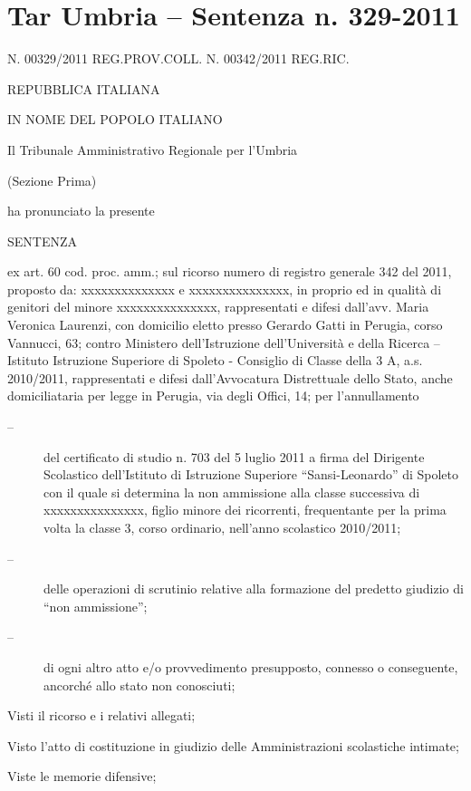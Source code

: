 \chapter{Tar Umbria – Sentenza n. 329-2011}
\label{cha:TarUmbriaSentenza329_2011}

N. 00329/2011 REG.PROV.COLL.
N. 00342/2011 REG.RIC.
\begin{center}
REPUBBLICA ITALIANA

IN NOME DEL POPOLO ITALIANO

Il Tribunale Amministrativo Regionale per l’Umbria

(Sezione Prima)

ha pronunciato la presente

SENTENZA
\end{center}


ex art. 60 cod. proc. amm.;
sul ricorso numero di registro generale 342 del 2011, proposto da:
xxxxxxxxxxxxxx e xxxxxxxxxxxxxxx, in proprio ed in qualità di genitori del minore xxxxxxxxxxxxxxx, rappresentati e difesi dall’avv. Maria Veronica Laurenzi, con domicilio eletto presso Gerardo Gatti in Perugia, corso Vannucci, 63; 
contro
Ministero dell'Istruzione dell'Università e della Ricerca – Istituto Istruzione Superiore  di Spoleto - Consiglio di Classe della 3 A, a.s. 2010/2011, rappresentati e difesi dall'Avvocatura Distrettuale dello Stato, anche domiciliataria per legge in Perugia, via degli Offici, 14; 
per l’annullamento
\begin{description}
	\item[--] del certificato di studio n. 703 del 5 luglio 2011 a firma del Dirigente Scolastico dell'Istituto di Istruzione Superiore “Sansi-Leonardo” di Spoleto con il quale si determina la non ammissione alla classe successiva di xxxxxxxxxxxxxxx, figlio minore dei ricorrenti, frequentante per la prima volta la classe 3, corso ordinario, nell'anno scolastico 2010/2011;
	\item [--] delle operazioni di scrutinio relative alla formazione del predetto giudizio di “non ammissione”;
	\item [--] di ogni altro atto e/o provvedimento presupposto, connesso o conseguente, ancorché allo stato non conosciuti;
	\end{description}
Visti il ricorso e i relativi allegati;

Visto l’atto di costituzione in giudizio delle Amministrazioni scolastiche intimate;

Viste le memorie difensive;

